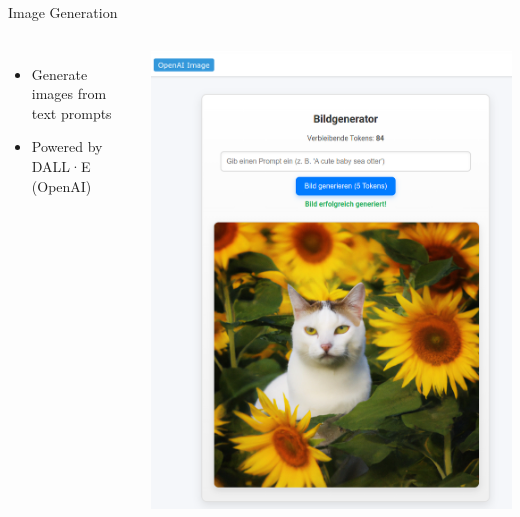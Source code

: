 \documentclass{beamer}
\begin{document}
\begin{frame}{Image Generation}
  \begin{columns}
      \begin{itemize}
        \item Generate images from text prompts
        \item Powered by DALL·E (OpenAI)
      \end{itemize}
      \centering
      \includegraphics[width=\textwidth]{image-generation.png}
  \end{columns}
\end{frame}
\end{document}

